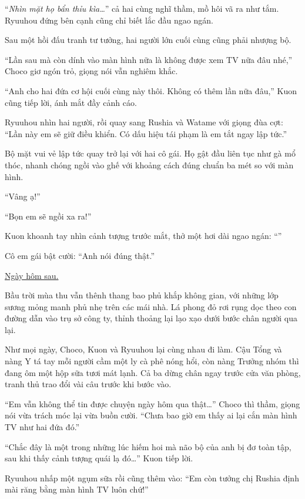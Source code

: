 \documentclass[../main.tex]{subfiles}
\begin{document}
``\textit{Nhìn mặt họ bẩn thỉu kìa\dots}'' cả hai cùng nghĩ thầm, mồ hôi vã ra như tắm. Ryuuhou đứng bên cạnh cũng chỉ biết lắc đầu ngao ngán.

Sau một hồi đấu tranh tư tưởng, hai người lớn cuối cùng cũng phải nhượng bộ.

``Lần sau mà còn dính vào màn hình nữa là không được xem TV nữa đâu nhé,'' Choco giơ ngón trỏ, giọng nói vẫn nghiêm khắc.

``Anh cho hai đứa cơ hội cuối cùng này thôi. Không có thêm lần nữa đâu,'' Kuon cũng tiếp lời, ánh mắt đầy cảnh cáo.

Ryuuhou nhìn hai người, rồi quay sang Rushia và Watame với giọng đùa cợt: ``Lần này em sẽ giữ điều khiển. Có dấu hiệu tái phạm là em tắt ngay lập tức.''

Bộ mặt vui vẻ lập tức quay trở lại với hai cô gái. Họ gật đầu liên tục như gà mổ thóc, nhanh chóng ngồi vào ghế với khoảng cách đúng chuẩn ba mét so với màn hình.

``Vâng ạ!''

``Bọn em sẽ ngồi xa ra!''

Kuon khoanh tay nhìn cảnh tượng trước mắt, thở một hơi dài ngao ngán: ``''

Cô em gái bật cười: ``Anh nói đúng thật.''

\begin{center}
  \uline{Ngày hôm sau.}
\end{center}

Bầu trời mùa thu vẫn thênh thang bao phủ khắp không gian, với những lớp sương mỏng manh phủ nhẹ trên các mái nhà. Lá phong đỏ rơi rụng dọc theo con đường dẫn vào trụ sở công ty, thỉnh thoảng lại lạo xạo dưới bước chân người qua lại.

Như mọi ngày, Choco, Kuon và Ryuuhou lại cùng nhau đi làm. Cậu Tổng và nàng Y tá tay mỗi người cầm một ly cà phê nóng hổi, còn nàng Trưởng nhóm thì đang ôm một hộp sữa tươi mát lạnh. Cả ba dừng chân ngay trước cửa văn phòng, tranh thủ trao đổi vài câu trước khi bước vào.

``Em vẫn không thể tin được chuyện ngày hôm qua thật\dots'' Choco thì thầm, giọng nói vừa trách móc lại vừa buồn cười. ``Chưa bao giờ em thấy ai lại cắn màn hình TV như hai đứa đó.''

``Chắc đây là một trong những lúc hiếm hoi mà não bộ của anh bị đơ toàn tập, sau khi thấy cảnh tượng quái lạ đó\dots'' Kuon tiếp lời.

Ryuuhou nhấp một ngụm sữa rồi cũng thêm vào: ``Em còn tưởng chị Rushia định mài răng bằng màn hình TV luôn chứ!''
\end{document}
